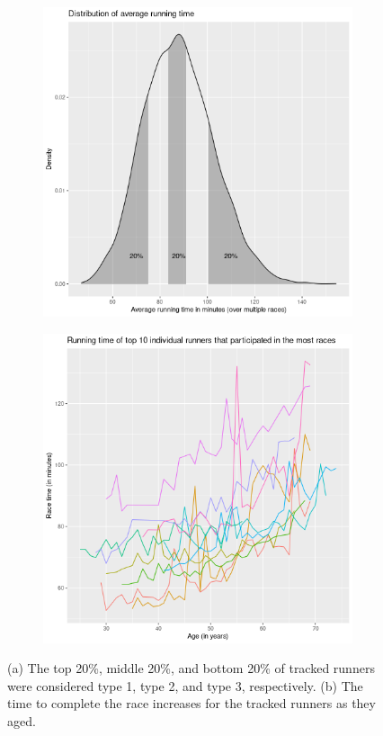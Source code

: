 \documentclass[12pt]{article}
\begin{document}
\begin{figure}
	\centering
	\begin{subfigure}[]{0.49\textwidth}
		\includegraphics[width = \textwidth]
		{../figure/elite_vs_nonelite_gr0-2.png}
		\caption{}
		\label{type123-dist}
	\end{subfigure}
	\begin{subfigure}[]{0.49\textwidth}
		\includegraphics[width = \textwidth]
		{../figure/overview_tracked_runners-2.png}
		\caption{}
		\label{top-10-tracked}
	\end{subfigure}
	\caption{
		(a) The top 20\%, middle 20\%, and bottom 20\% of
			tracked runners were considered type 1, type 2, and
			type 3, respectively.
		(b) The time to complete the race increases for the
			tracked runners as they aged.
	}
	\label{type123}
\end{figure}
\end{document}
